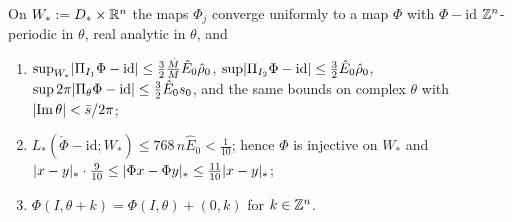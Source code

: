 \begin{lemma}\label{bpP:p3:limit-phi}
On $W_*:=D_*\times\mathbb{R}^n$ the maps $\Phi_j$ converge uniformly to a map $\Phi$ with $\Phi-\mathrm{id}$ $\mathbb{Z}^n$-periodic in $\theta$, real analytic in $\theta$, and
\begin{enumerate}[label=(\roman*)]
\item $\sup_{W_*}\lvert \Pi_{I_1}\Phi-\mathrm{id}\rvert\le\frac32\frac{\hat M}M\hat E_0\hat\rho_0$, $\sup\lvert \Pi_{I_2}\Phi-\mathrm{id}\rvert\le\frac32\hat E_0\hat\rho_0$, $\sup2\pi\lvert \Pi_\theta\Phi-\mathrm{id}\rvert\le\frac32\hat E_0s_0$, and the same bounds on complex $\theta$ with $\lvert \operatorname{Im}\theta\rvert<\bar s/2\pi$;
\item $L_*(\check\Phi-\mathrm{id};W_*)\le768\,n\hat E_0<\frac1{10}$; hence $\Phi$ is injective on $W_*$ and $\lvert x-y\rvert_*\cdot\frac9{10}\le\lvert \Phi x-\Phi y\rvert_*\le\frac{11}{10}\lvert x-y\rvert_*$;
\item $\Phi(I,\theta+k)=\Phi(I,\theta)+(0,k)$ for $k\in\mathbb{Z}^n$.
\end{enumerate}
\end{lemma}
